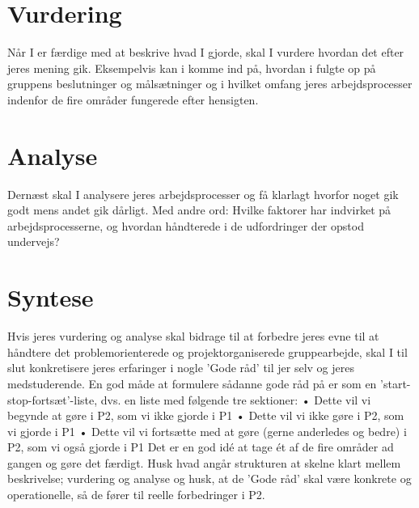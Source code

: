 \section{Vurdering}

Når I er færdige med at beskrive hvad I gjorde, skal I vurdere hvordan det efter jeres mening gik.
Eksempelvis kan i komme ind på, hvordan i fulgte op på gruppens beslutninger og målsætninger og
i hvilket omfang jeres arbejdsprocesser indenfor de fire områder fungerede efter hensigten.


\section{Analyse}

Dernæst skal I analysere jeres arbejdsprocesser og få klarlagt hvorfor noget gik godt mens andet gik
dårligt. Med andre ord: Hvilke faktorer har indvirket på arbejdsprocesserne, og hvordan håndterede
i de udfordringer der opstod undervejs?


\section{Syntese}

Hvis jeres vurdering og analyse skal bidrage til at forbedre jeres evne til at håndtere det
problemorienterede og projektorganiserede gruppearbejde, skal I til slut konkretisere jeres
erfaringer i nogle ’Gode råd’ til jer selv og jeres medstuderende. En god måde at formulere sådanne
gode råd på er som en ’start-stop-fortsæt’-liste, dvs. en liste med følgende tre sektioner:
    •   Dette vil vi begynde at gøre i P2, som vi ikke gjorde i P1
    •   Dette vil vi ikke gøre i P2, som vi gjorde i P1
    •   Dette vil vi fortsætte med at gøre (gerne anderledes og bedre) i P2, som vi også gjorde i P1
Det er en god idé at tage ét af de fire områder ad gangen og gøre det færdigt. Husk hvad angår
strukturen at skelne klart mellem beskrivelse; vurdering og analyse og husk, at de ’Gode råd’ skal
være konkrete og operationelle, så de fører til reelle forbedringer i P2.
